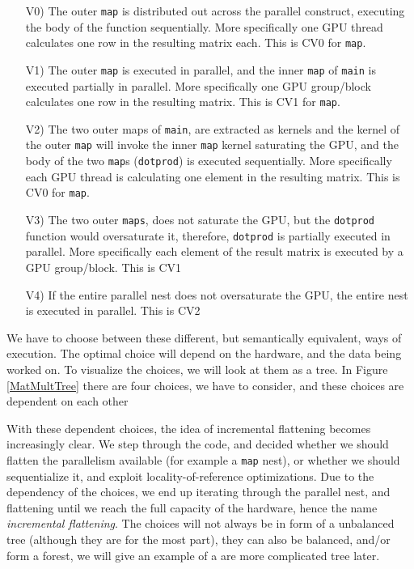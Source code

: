 \begin{itemize}
	\item[V0)] The outer \texttt{map} is distributed out across the parallel construct, executing the body of the function sequentially. More specifically one GPU thread calculates one row in the resulting matrix each. This is CV0 for \texttt{map}.
	\item[V1)] The outer \texttt{map} is executed in parallel, and the inner \texttt{map} of \texttt{main} is executed partially in parallel. More specifically one GPU group/block calculates one row in the resulting matrix. This is CV1 for \texttt{map}. 
	\item[V2)] The two outer maps of \texttt{main}, are extracted as kernels and the kernel of the outer \texttt{map} will invoke the inner \texttt{map} kernel saturating the GPU, and the body of the two \texttt{map}s (\texttt{dotprod}) is executed sequentially. More specifically each GPU thread is calculating one element in the resulting matrix. This is CV0 for \texttt{map}.
	\item[V3)] The two outer \texttt{maps}, does not saturate the GPU, but the \texttt{dotprod} function would oversaturate it, therefore, \texttt{dotprod} is partially executed in parallel. More specifically each element of the result matrix is executed by a GPU group/block. This is CV1
	\item[V4)] If the entire parallel nest does not oversaturate the GPU, the entire nest is executed in parallel. This is CV2
\end{itemize} 
We have to choose between these different, but semantically equivalent, ways of execution. The optimal choice will depend on the hardware, and the data being worked on. To visualize the choices, we will look at them as a tree. In Figure \ref{MatMultTree} there are four choices, we have to consider, and these choices are dependent on each other
\begin{center}
	\centering 
	
	\label{MatMultTree}
\end{center}
With these dependent choices, the idea of incremental flattening becomes increasingly clear. We step through the code, and decided whether we should flatten the parallelism available (for example a \texttt{map} nest), or whether we should sequentialize it, and exploit locality-of-reference optimizations. Due to the dependency of the choices, we end up iterating through the parallel nest, and flattening until we reach the full capacity of the hardware, hence the name \textit{incremental flattening}. The choices will not always be in form of a unbalanced tree (although they are for the most part), they can also be balanced, and/or form a forest, we will give an example of a are more complicated tree later.

